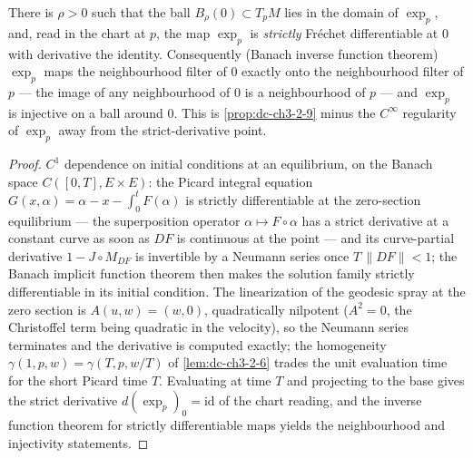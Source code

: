 \begin{lemma}
  \label{lem:dc-ch3-2-9-strict}


  There is $\rho > 0$ such that the ball $B_\rho(0) \subset T_pM$ lies in the
  domain of $\exp_p$, and, read in the chart at $p$, the map $\exp_p$ is
  \emph{strictly} Fréchet differentiable at $0$ with derivative the identity.
  Consequently (Banach inverse function theorem) $\exp_p$ maps the
  neighbourhood filter of $0$ exactly onto the neighbourhood filter of $p$ —
  the image of any neighbourhood of $0$ is a neighbourhood of $p$ — and
  $\exp_p$ is injective on a ball around $0$. This is
  \cref{prop:dc-ch3-2-9} minus the $C^\infty$ regularity of $\exp_p$ away from
  the strict-derivative point.
\end{lemma}
\begin{proof}
  \sketch

  $C^1$ dependence on initial conditions at an equilibrium, on the Banach
  space $C([0,T], E \times E)$: the Picard integral equation
  $G(x, \alpha) = \alpha - x - \int_0^t F(\alpha)$ is strictly differentiable
  at the zero-section equilibrium — the superposition operator
  $\alpha \mapsto F \circ \alpha$ has a strict derivative at a constant curve
  as soon as $DF$ is continuous at the point — and its curve-partial
  derivative $1 - J \circ M_{DF}$ is invertible by a Neumann series once
  $T\,\|DF\| < 1$; the Banach implicit function theorem then makes the
  solution family strictly differentiable in its initial condition. The
  linearization of the geodesic spray at the zero section is
  $A(u, w) = (w, 0)$, quadratically nilpotent ($A^2 = 0$, the Christoffel term
  being quadratic in the velocity), so the Neumann series terminates and the
  derivative is computed exactly; the homogeneity
  $\gamma(1, p, w) = \gamma(T, p, w/T)$ of \cref{lem:dc-ch3-2-6} trades the
  unit evaluation time for the short Picard time $T$. Evaluating at time $T$
  and projecting to the base gives the strict derivative
  $d(\exp_p)_0 = \mathrm{id}$ of the chart reading, and the inverse function
  theorem for strictly differentiable maps yields the neighbourhood and
  injectivity statements.
\end{proof}

